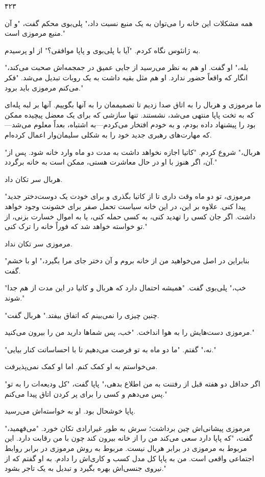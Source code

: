 ۴۲۳

همه مشکلات این خانه را می‌توان به یک منبع نسبت داد،" پلی‌بوی محکم گفت، "و آن منبع مرموزی است." 

به ژانئوس نگاه کردم. "آیا با پلی‌بوی و پاپا موافقی؟" از او پرسیدم. 

"بله،" او گفت. او هم به نظر می‌رسید از جایی عمیق در جمجمه‌اش صحبت می‌کند، انگار که واقعاً حضور ندارد. او هم مثل بقیه داشت به یک روبات تبدیل می‌شد. "فکر می‌کنم مرموزی باید برود." 

ما مرموزی و هربال را به اتاق صدا زدیم تا تصمیممان را به آنها بگوییم. آنها بر لبه پله‌ای که به تخت پاپا منتهی می‌شد، نشستند. تنها سازشی که برای یک معضل پیچیده ممکن بود را پیشنهاد داده بودم، و به خودم افتخار می‌کردم—به اشتباه، بعداً معلوم می‌شد—که مهارت‌های رهبری جدید خود را به شکلی سلیمان‌وار اعمال کرده‌ام. 

"هربال،" شروع کردم. "کاتیا اجازه نخواهد داشت به مدت دو ماه وارد خانه شود. پس از آن، اگر هنوز با او در حال معاشرت هستی، ممکن است به خانه برگردد." 

هربال سر تکان داد. 

"مرموزی، تو دو ماه وقت داری تا از کاتیا بگذری و برای خودت یک دوست‌دختر جدید پیدا کنی. علاوه بر این، در این خانه سیاست تحمل صفر برای خشونت وجود خواهد داشت. اگر جان کسی را تهدید کنی، به کسی حمله کنی، یا به اموال خسارت بزنی، از تو خواسته خواهد شد که فوراً خانه را ترک کنی." 

مرموزی سر تکان نداد. 

"بنابراین در اصل می‌خواهید من از خانه بروم و آن دختر جای مرا بگیرد،" او با خشم گفت. 

"خب،" پلی‌بوی گفت. "همیشه احتمال دارد که هربال و کاتیا در این مدت از هم جدا شوند." 

"چنین چیزی را نمی‌بینم که اتفاق بیفتد." هربال گفت. 

مرموزی دست‌هایش را به هوا انداخت. "خب، پس شماها دارید من را بیرون می‌کنید." 

"نه،" گفتم. "ما دو ماه به تو فرصت می‌دهیم تا با احساساتت کنار بیایی." 

می‌خواستم به او کمک کنم. اما او کمک نمی‌پذیرفت. 

"اگر حداقل دو هفته قبل از رفتنت به من اطلاع بدهی،" پاپا گفت، "کل ودیعه‌ات را به تو پس می‌دهم و کسی را برای پر کردن اتاق پیدا می‌کنم." 

پاپا خوشحال بود. او به خواسته‌اش می‌رسید. 

مرموزی پیشانی‌اش چین برداشت؛ سرش به طور غیرارادی تکان خورد. "می‌فهمید،" گفت، "که پاپا دارد سعی می‌کند من را از خانه بیرون کند چون با من رقابت دارد. این مربوط به مرموزی در برابر هربال نیست. مربوط به روش مرموزی در برابر روابط اجتماعی واقعی است. من به پاپا کل مدل کسب و کاری‌اش را دادم. به او گفتم که از نیروی جنسی‌اش بهره بگیرد و تبدیل به یک تاجر بشود." 

